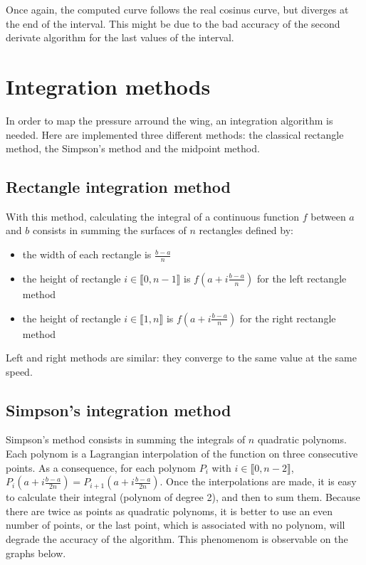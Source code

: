 \documentclass{article}
\begin{document}
Once again, the computed curve follows the real cosinus curve, but diverges at the end of the interval. This might be due to the bad accuracy of the second derivate algorithm for the last values of the interval.

\section{Integration methods}
In order to map the pressure arround the wing, an integration algorithm is needed. Here are implemented three different methods: the classical rectangle method, the Simpson's method and the midpoint method.

\subsection{Rectangle integration method}
With this method, calculating the integral of a continuous function $f$ between $a$ and $b$ consists in summing the surfaces of $n$ rectangles defined by:
\begin{itemize}
\item the width of each rectangle is $\frac{b - a}{n}$
\item the height of rectangle $i \in \llbracket 0, n - 1 \rrbracket$ is $f(a + i\frac{b - a}{n})$ for the left rectangle method
\item the height of rectangle $i \in \llbracket 1, n \rrbracket$ is $f(a + i\frac{b - a}{n})$ for the right rectangle method
\end{itemize}
Left and right methods are similar: they converge to the same value at the same speed.

\subsection{Simpson's integration method}
Simpson's method consists in summing the integrals of $n$ quadratic polynoms. Each polynom is a Lagrangian interpolation of the function on three consecutive points.
As a consequence, for each polynom $P_i$ with $i \in \llbracket 0, n - 2 \rrbracket$, $P_i(a + i \frac{b-a}{2n}) = P_{i+1}(a + i \frac{b-a}{2n})$. Once the interpolations are made, it is easy to calculate their integral (polynom of degree 2), and then to sum them. Because there are twice as points as quadratic polynoms, it is better to use an even number of points, or the last point, which is associated with no polynom, will degrade the accuracy of the algorithm. This phenomenom is observable on the graphs below.
\end{document}
